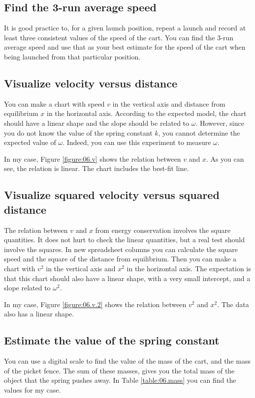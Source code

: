 \subsection{Find the 3-run average speed}
%
It is good practice to, for a given launch position, repeat a launch and record at least three consistent values of the speed of the cart. You can find the 3-run average speed and use that as your best estimate for the speed of the cart when being launched from that particular position.
%
\subsection{Visualize velocity versus distance}
%
You can make a chart with speed $v$ in the vertical axis and distance from equilibrium $x$ in the horizontal axis. According to the expected model, the chart should have a linear shape and the slope should be related to $\omega$. However, since you do not know the value of the spring constant $k$, you cannot determine the expected value of $\omega$. Indeed, you can use this experiment to measure $\omega$.

In my case, Figure \ref{figure:06.v} shows the relation between $v$ and $x$. As you can see, the relation is linear. The chart includes the best-fit line.
%
\subsection{Visualize squared velocity versus squared distance}
%
The relation between $v$ and $x$ from energy conservation involves the square quantities. It does not hurt to check the linear quantities, but a real test should involve the squares. In new spreadsheet columns you can calculate the square speed and the square of the distance from equilibrium. Then you can make a chart with $v^{2}$ in the vertical axis and $x^{2}$ in the horizontal axis. The expectation is that this chart should also have a linear shape, with a very small intercept, and a slope related to $\omega^{2}$.

In my case, Figure \ref{figure:06.v.2} shows the relation between $v^{2}$ and $x^{2}$. The data also has a linear shape.
%
\subsection{Estimate the value of the spring constant}
%
You can use a digital scale to find the value of the mass of the cart, and the mass of the picket fence. The sum of these masses, gives you the total mass of the object that the spring pushes away. In Table \ref{table:06.mass} you can find the values for my case.

